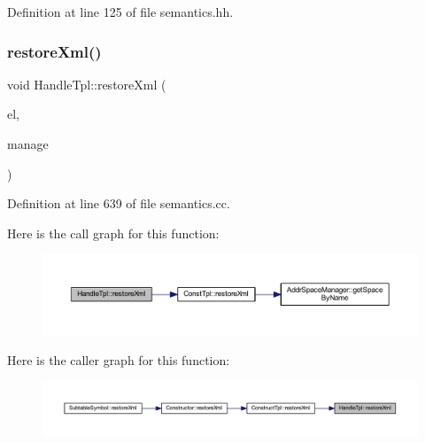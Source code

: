 Definition at line 125 of file semantics.\+hh.

\mbox{\label{class_handle_tpl_a6dbad0fa7a1f102c7cc70763932c9b67}} 
\subsubsection{\texorpdfstring{restoreXml()}{restoreXml()}}
{\footnotesize\ttfamily void Handle\+Tpl\+::restore\+Xml (\begin{DoxyParamCaption}\item[{const \mbox{\hyperlink{class_element}{Element}} $\ast$}]{el,  }\item[{const \mbox{\hyperlink{class_addr_space_manager}{Addr\+Space\+Manager}} $\ast$}]{manage }\end{DoxyParamCaption})}



Definition at line 639 of file semantics.\+cc.

Here is the call graph for this function\+:
\nopagebreak
\begin{figure}[H]
\begin{center}
\leavevmode
\includegraphics[width=350pt]{class_handle_tpl_a6dbad0fa7a1f102c7cc70763932c9b67_cgraph}
\end{center}
\end{figure}
Here is the caller graph for this function\+:
\nopagebreak
\begin{figure}[H]
\begin{center}
\leavevmode
\includegraphics[width=350pt]{class_handle_tpl_a6dbad0fa7a1f102c7cc70763932c9b67_icgraph}
\end{center}
\end{figure}
\mbox{\label{class_handle_tpl_aee0b4e635198cb82374e925c6b7c9475}} 
